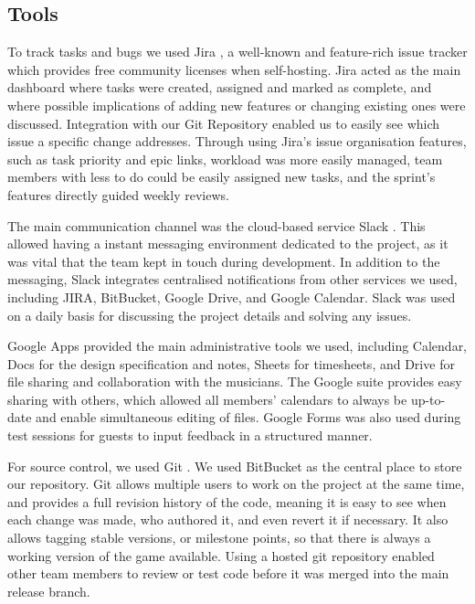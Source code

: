 \documentclass[a4paper,11pt]{article}
\begin{document}
\subsection{Tools}

To track tasks and bugs we used Jira \cite{jira}, a well-known and feature-rich issue tracker which provides free community licenses when self-hosting. Jira acted as the main dashboard where tasks were created, assigned and marked as complete, and where possible implications of adding new features or changing existing ones were discussed. Integration with our Git Repository enabled us to easily see which issue a specific change addresses. Through using Jira’s issue organisation features, such as task priority and epic links, workload was more easily managed, team members with less to do could be easily assigned new tasks, and the sprint’s features directly guided weekly reviews.

The main communication channel was the cloud-based service Slack \cite{slack}. This allowed having a instant messaging environment dedicated to the project, as it was vital that the team kept in touch during development. In addition to the messaging, Slack integrates centralised notifications from other services we used, including JIRA, BitBucket, Google Drive, and Google Calendar. Slack was used on a daily basis for discussing the project details and solving any issues.

Google Apps \cite{google_apps} provided the main administrative tools we used, including Calendar, Docs for the design specification and notes, Sheets for timesheets, and Drive for file sharing and collaboration with the musicians. The Google suite provides easy sharing with others, which allowed all members’ calendars to always be up-to-date and enable simultaneous editing of files. Google Forms was also used during test sessions for guests to input feedback in a structured manner.

For source control, we used Git \cite{git}. We used BitBucket \cite{bitbucket} as the central place to store our repository. Git allows multiple users to work on the project at the same time, and provides a full revision history of the code, meaning it is easy to see when each change was made, who authored it, and even revert it if necessary. It also allows tagging stable versions, or milestone points, so that there is always a working version of the game available. Using a hosted git repository enabled other team members to review or test code before it was merged into the main release branch.
\end{document}
